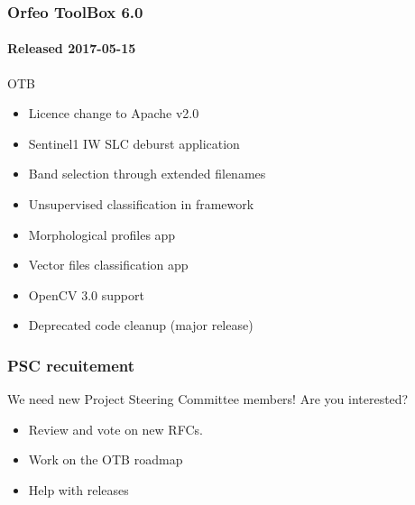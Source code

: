 \documentclass[8pt]{beamer}
\begin{document}
\begin{frame}
\frametitle{Orfeo ToolBox 6.0}
\framesubtitle{Released 2017-05-15}
  \begin{block}{OTB}
    \begin{itemize}
      \item Licence change to  Apache v2.0
      \item Sentinel1 IW SLC deburst application
      \item Band selection through extended filenames
      \item Unsupervised classification in framework
      \item Morphological profiles app
      \item Vector files classification app
      \item OpenCV 3.0 support
      \item Deprecated code cleanup (major release)
    \end{itemize}
    \end{block}
\end{frame}

\begin{frame}
\frametitle{PSC recuitement}
We need new Project Steering Committee members! Are you interested?
\begin{itemize}
    \item Review and vote on new RFCs.
    \item Work on the OTB roadmap
    \item Help with releases
\end{itemize}
\end{frame}
\end{document}
